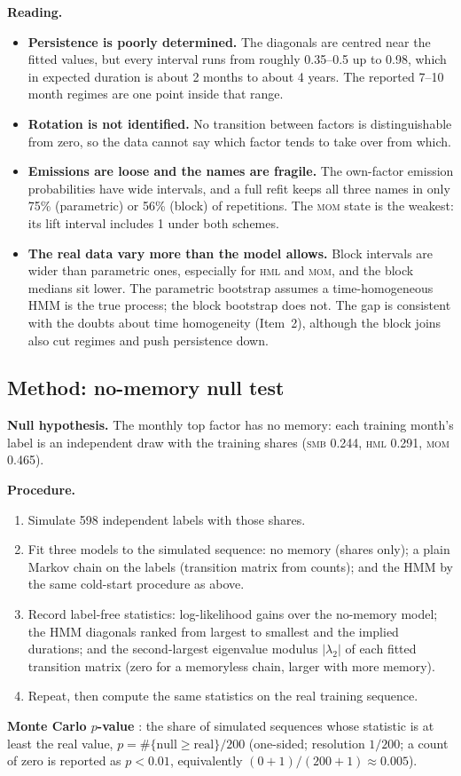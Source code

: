 \documentclass[11pt]{article}
\newcommand{\SMB}{\textsc{smb}}
\newcommand{\HML}{\textsc{hml}}
\newcommand{\MOM}{\textsc{mom}}
\begin{document}
\textbf{Reading.}
\begin{itemize}
\item \textbf{Persistence is poorly determined.} The diagonals are centred near the fitted values, but every interval runs from roughly 0.35--0.5 up to 0.98, which in expected duration is about 2 months to about 4 years. The reported 7--10 month regimes are one point inside that range.
\item \textbf{Rotation is not identified.} No transition between factors is distinguishable from zero, so the data cannot say which factor tends to take over from which.
\item \textbf{Emissions are loose and the names are fragile.} The own-factor emission probabilities have wide intervals, and a full refit keeps all three names in only 75\% (parametric) or 56\% (block) of repetitions. The \MOM{} state is the weakest: its lift interval includes 1 under both schemes.
\item \textbf{The real data vary more than the model allows.} Block intervals are wider than parametric ones, especially for \HML{} and \MOM, and the block medians sit lower. The parametric bootstrap assumes a time-homogeneous HMM is the true process; the block bootstrap does not. The gap is consistent with the doubts about time homogeneity (Item~2), although the block joins also cut regimes and push persistence down.
\end{itemize}

\subsection{Method: no-memory null test}
\textbf{Null hypothesis.} The monthly top factor has no memory: each training month's label is an independent draw with the training shares (\SMB{} 0.244, \HML{} 0.291, \MOM{} 0.465).

\textbf{Procedure.}
\begin{enumerate}
\item Simulate 598 independent labels with those shares.
\item Fit three models to the simulated sequence: no memory (shares only); a plain Markov chain on the labels (transition matrix from counts); and the HMM by the same cold-start procedure as above.
\item Record label-free statistics: log-likelihood gains over the no-memory model; the HMM diagonals ranked from largest to smallest and the implied durations; and the second-largest eigenvalue modulus $|\lambda_2|$ of each fitted transition matrix (zero for a memoryless chain, larger with more memory).
\item Repeat, then compute the same statistics on the real training sequence.
\end{enumerate}
\textbf{Monte Carlo $p$-value} \citep{davison1997}: the share of simulated sequences whose statistic is at least the real value, $p=\#\{\text{null}\ge\text{real}\}/200$ (one-sided; resolution $1/200$; a count of zero is reported as $p<0.01$, equivalently $(0+1)/(200+1)\approx0.005$).
\end{document}
